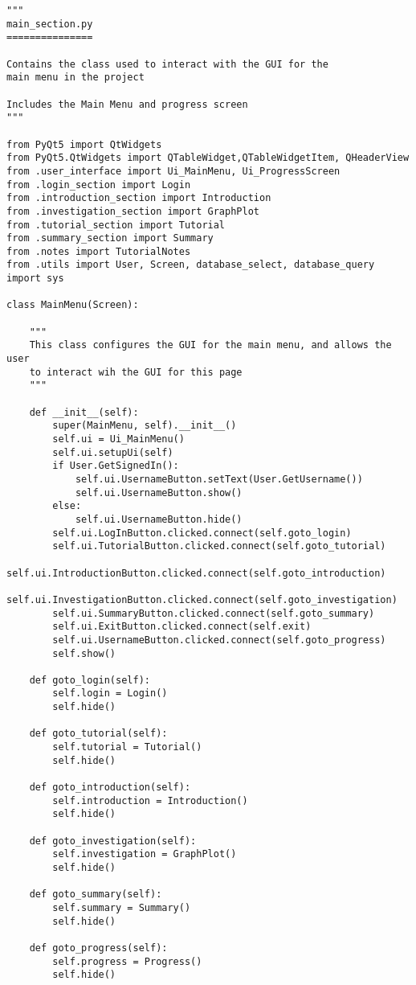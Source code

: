 \documentclass{article}
\begin{document}
\begin{lstlisting}
"""
main_section.py
===============

Contains the class used to interact with the GUI for the
main menu in the project

Includes the Main Menu and progress screen
"""

from PyQt5 import QtWidgets
from PyQt5.QtWidgets import QTableWidget,QTableWidgetItem, QHeaderView
from .user_interface import Ui_MainMenu, Ui_ProgressScreen
from .login_section import Login
from .introduction_section import Introduction
from .investigation_section import GraphPlot
from .tutorial_section import Tutorial
from .summary_section import Summary
from .notes import TutorialNotes
from .utils import User, Screen, database_select, database_query
import sys

class MainMenu(Screen):

    """
    This class configures the GUI for the main menu, and allows the user
    to interact wih the GUI for this page
    """

    def __init__(self):
        super(MainMenu, self).__init__()
        self.ui = Ui_MainMenu()
        self.ui.setupUi(self)
        if User.GetSignedIn():
            self.ui.UsernameButton.setText(User.GetUsername())
            self.ui.UsernameButton.show()
        else:
            self.ui.UsernameButton.hide()
        self.ui.LogInButton.clicked.connect(self.goto_login)
        self.ui.TutorialButton.clicked.connect(self.goto_tutorial)
        self.ui.IntroductionButton.clicked.connect(self.goto_introduction)
        self.ui.InvestigationButton.clicked.connect(self.goto_investigation)
        self.ui.SummaryButton.clicked.connect(self.goto_summary)
        self.ui.ExitButton.clicked.connect(self.exit)
        self.ui.UsernameButton.clicked.connect(self.goto_progress)
        self.show()

    def goto_login(self):
        self.login = Login()
        self.hide()

    def goto_tutorial(self):
        self.tutorial = Tutorial()
        self.hide()

    def goto_introduction(self):
        self.introduction = Introduction()
        self.hide()

    def goto_investigation(self):
        self.investigation = GraphPlot()
        self.hide()

    def goto_summary(self):
        self.summary = Summary()
        self.hide()

    def goto_progress(self):
        self.progress = Progress()
        self.hide()


\end{lstlisting}
\end{document}

